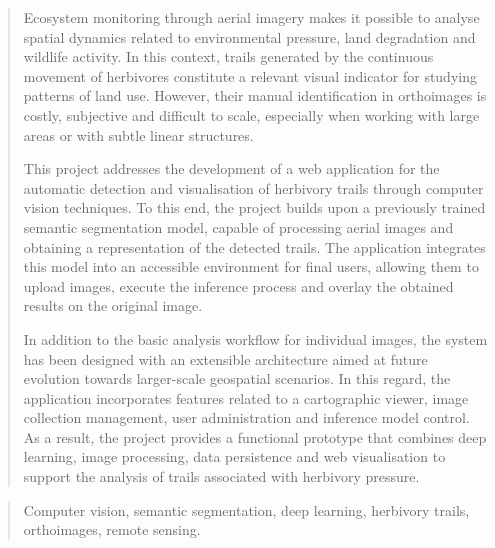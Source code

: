 \documentclass[a4paper,12pt,twoside]{memoir}
\begin{document}
\renewcommand*\abstractname{Abstract}
\begin{abstract}
	Ecosystem monitoring through aerial imagery makes it possible to analyse spatial dynamics related to environmental pressure, land degradation and wildlife activity. In this context, trails generated by the continuous movement of herbivores constitute a relevant visual indicator for studying patterns of land use. However, their manual identification in orthoimages is costly, subjective and difficult to scale, especially when working with large areas or with subtle linear structures.
	
	This project addresses the development of a web application for the automatic detection and visualisation of herbivory trails through computer vision techniques. To this end, the project builds upon a previously trained semantic segmentation model, capable of processing aerial images and obtaining a representation of the detected trails. The application integrates this model into an accessible environment for final users, allowing them to upload images, execute the inference process and overlay the obtained results on the original image.
	
	In addition to the basic analysis workflow for individual images, the system has been designed with an extensible architecture aimed at future evolution towards larger-scale geospatial scenarios. In this regard, the application incorporates features related to a cartographic viewer, image collection management, user administration and inference model control. As a result, the project provides a functional prototype that combines deep learning, image processing, data persistence and web visualisation to support the analysis of trails associated with herbivory pressure.
\end{abstract}

\renewcommand*\abstractname{Keywords}
\begin{abstract}
	Computer vision, semantic segmentation, deep learning, herbivory trails, orthoimages, remote sensing.
\end{abstract}

\clearpage

\tableofcontents

\clearpage

\listoffigures

\clearpage

\listoftables
\clearpage

\mainmatter











\end{document}
